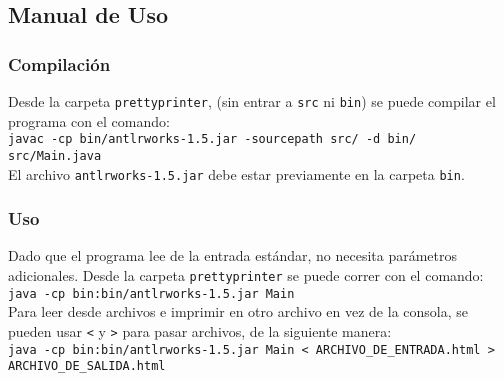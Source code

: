 \subsection{Manual de Uso}

\subsubsection{Compilación}
Desde la carpeta \texttt{prettyprinter}, (sin entrar a \texttt{src} ni \texttt{bin}) se puede compilar el programa con el comando:\\

  \texttt{javac -cp bin/antlrworks-1.5.jar -sourcepath src/ -d bin/ src/Main.java }\\

El archivo \texttt{antlrworks-1.5.jar} debe estar previamente en la carpeta \texttt{bin}.

\subsubsection{Uso}

Dado que el programa lee de la entrada estándar, no necesita parámetros adicionales. Desde la carpeta \texttt{prettyprinter} se puede correr con el comando:\\

  \texttt{java -cp bin:bin/antlrworks-1.5.jar Main}\\


Para leer desde archivos e imprimir en otro archivo en vez de la consola, se pueden usar \texttt{<} y \texttt{>} para pasar archivos, de la siguiente manera:\\

  \texttt{java -cp bin:bin/antlrworks-1.5.jar Main < ARCHIVO\_DE\_ENTRADA.html > ARCHIVO\_DE\_SALIDA.html}\\



